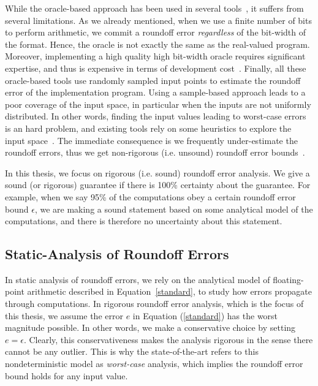 While the oracle-based approach has been used in several tools~\cite{landau2014guide, kahan1996improbability, atomic, blame, herbie}, it suffers from several limitations.
%
As we already mentioned, when we use a finite number of bits to perform arithmetic, we commit a roundoff error \emph{regardless} of the bit-width of the format.
%
Hence, the oracle is not exactly the same as the real-valued program.
%
%
Moreover, implementing a high quality high bit-width oracle requires significant expertise, and thus is expensive in terms of development cost~\cite{atomic}.
%
Finally, all these oracle-based tools use randomly sampled input points to estimate the roundoff error of the implementation program.
%
Using a sample-based approach leads to a poor coverage of the input space, in particular when the inputs are not uniformly distributed.
%
In other words, finding the input values leading to worst-case errors is an hard problem, and existing tools rely on some heuristics to explore the input space~\cite{dynamic}. 
%
The immediate consequence is we frequently under-estimate the roundoff errors, thus we get non-rigorous (i.e. unsound) roundoff error bounds~\cite{glasserman2013monte, parker2000monte, herbie}.
%

In this thesis, we focus on rigorous (i.e. sound) roundoff error analysis.
%
We give a sound (or rigorous) guarantee if there is 100\% certainty about the guarantee.
%
%
For example, when we say 95\% of the computations obey a certain roundoff error bound $\epsilon$, we are making a sound statement based on some analytical model of the computations, and there is therefore no uncertainty about this statement.
%
%
\subsection{Static-Analysis of Roundoff Errors}
\label{sec:worst}
%
In static analysis of roundoff errors, we rely on the analytical model of floating-point arithmetic described in Equation~\ref{standard}, to study how errors propagate through computations.
%
In rigorous roundoff error analysis, which is the focus of this thesis, we assume the error $e$ in Equation (\ref{standard}) has the worst magnitude possible. In other words, we make a conservative choice by setting $e=\epsilon$.
%
Clearly, this conservativeness makes the analysis rigorous in the sense there cannot be any outlier.
%
This is why the state-of-the-art refers to this nondeterministic model as \emph{worst-case} analysis, which implies the roundoff error bound holds for any input value.
%

